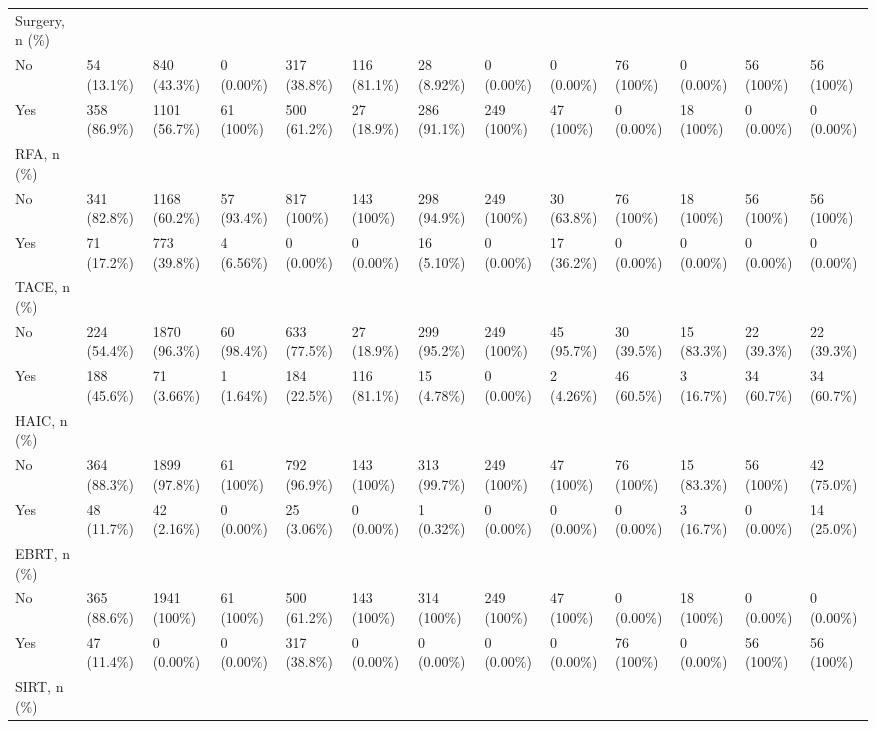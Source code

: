 \begin{landscape}
\begin{center}
\begin{longtable}{p{5.2cm}p{3.0cm}}
Surgery, n (\%) &  &  &  &  &  &  &  &  &  &  &  &  \\
No & 54 (13.1\%) & 840 (43.3\%) & 0 (0.00\%) & 317 (38.8\%) & 116 (81.1\%) & 28 (8.92\%) & 0 (0.00\%) & 0 (0.00\%) & 76 (100\%) & 0 (0.00\%) & 56 (100\%) & 56 (100\%) \\
Yes & 358 (86.9\%) & 1101 (56.7\%) & 61 (100\%) & 500 (61.2\%) & 27 (18.9\%) & 286 (91.1\%) & 249 (100\%) & 47 (100\%) & 0 (0.00\%) & 18 (100\%) & 0 (0.00\%) & 0 (0.00\%) \\
RFA, n (\%) &  &  &  &  &  &  &  &  &  &  &  &  \\
No & 341 (82.8\%) & 1168 (60.2\%) & 57 (93.4\%) & 817 (100\%) & 143 (100\%) & 298 (94.9\%) & 249 (100\%) & 30 (63.8\%) & 76 (100\%) & 18 (100\%) & 56 (100\%) & 56 (100\%) \\
Yes & 71 (17.2\%) & 773 (39.8\%) & 4 (6.56\%) & 0 (0.00\%) & 0 (0.00\%) & 16 (5.10\%) & 0 (0.00\%) & 17 (36.2\%) & 0 (0.00\%) & 0 (0.00\%) & 0 (0.00\%) & 0 (0.00\%) \\
TACE, n (\%) &  &  &  &  &  &  &  &  &  &  &  &  \\
No & 224 (54.4\%) & 1870 (96.3\%) & 60 (98.4\%) & 633 (77.5\%) & 27 (18.9\%) & 299 (95.2\%) & 249 (100\%) & 45 (95.7\%) & 30 (39.5\%) & 15 (83.3\%) & 22 (39.3\%) & 22 (39.3\%) \\
Yes & 188 (45.6\%) & 71 (3.66\%) & 1 (1.64\%) & 184 (22.5\%) & 116 (81.1\%) & 15 (4.78\%) & 0 (0.00\%) & 2 (4.26\%) & 46 (60.5\%) & 3 (16.7\%) & 34 (60.7\%) & 34 (60.7\%) \\
HAIC, n (\%) &  &  &  &  &  &  &  &  &  &  &  &  \\
No & 364 (88.3\%) & 1899 (97.8\%) & 61 (100\%) & 792 (96.9\%) & 143 (100\%) & 313 (99.7\%) & 249 (100\%) & 47 (100\%) & 76 (100\%) & 15 (83.3\%) & 56 (100\%) & 42 (75.0\%) \\
Yes & 48 (11.7\%) & 42 (2.16\%) & 0 (0.00\%) & 25 (3.06\%) & 0 (0.00\%) & 1 (0.32\%) & 0 (0.00\%) & 0 (0.00\%) & 0 (0.00\%) & 3 (16.7\%) & 0 (0.00\%) & 14 (25.0\%) \\
EBRT, n (\%) &  &  &  &  &  &  &  &  &  &  &  &  \\
No & 365 (88.6\%) & 1941 (100\%) & 61 (100\%) & 500 (61.2\%) & 143 (100\%) & 314 (100\%) & 249 (100\%) & 47 (100\%) & 0 (0.00\%) & 18 (100\%) & 0 (0.00\%) & 0 (0.00\%) \\
Yes & 47 (11.4\%) & 0 (0.00\%) & 0 (0.00\%) & 317 (38.8\%) & 0 (0.00\%) & 0 (0.00\%) & 0 (0.00\%) & 0 (0.00\%) & 76 (100\%) & 0 (0.00\%) & 56 (100\%) & 56 (100\%) \\
SIRT, n (\%) &  &  &  &  &  &  &  &  &  &  &  &  \\

\end{longtable}
\end{center}
\end{landscape}
